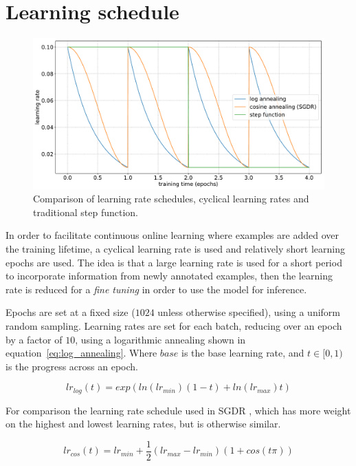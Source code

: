 \section {Learning schedule}
\label{sec:schedule}

\begin{figure}[h]
  \centering
  \includegraphics[width=1.0\linewidth]{charts/training/lr_schedules.pdf}
  \caption{Comparison of learning rate schedules, cyclical learning rates and traditional step function.  }  
  \label{fig:lr_schedule}
\end{figure}

In order to facilitate continuous online learning where examples are added over the training lifetime, a cyclical learning rate is used and relatively short learning epochs are used. The idea is that a large learning rate is used for a short period to incorporate information from newly annotated examples, then the learning rate is reduced for a \emph{fine tuning} in order to use the model for inference.

Epochs are set at a fixed size ($1024$ unless otherwise specified), using a uniform random sampling. Learning rates are set for each batch, reducing over an epoch by a factor of $10$, using a logarithmic annealing shown in equation~\ref{eq:log_annealing}. Where $base$ is the base learning rate, and $ t \in [0, 1) $ is the progress across an epoch.

\begin{equation}
lr_{log}(t) = exp(ln (lr_{min}) (1 - t) + ln(lr_{max})  t)
\label{eq:log_annealing}
\end{equation}

For comparison the learning rate schedule used in \gls{SGDR} \cite{Loshchilov2016}, which has more weight on the highest and lowest learning rates, but is otherwise similar.

\begin{equation}
lr_{cos}(t) = lr_{min} +  \frac{1}{2} (lr_{max} - lr_{min}) (1 + cos (t \pi))
\label{eq:cosine_annealing}
\end{equation}

